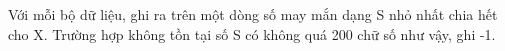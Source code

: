 Với mỗi bộ dữ liệu, ghi ra trên một dòng số may mắn dạng S nhỏ nhất chia hết cho X. Trường hợp không tồn tại số S có không quá 200 chữ số như vậy, ghi -1.